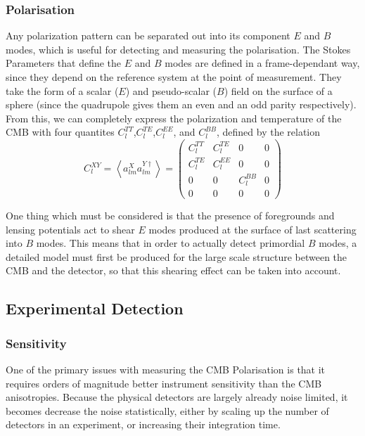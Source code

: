\subsubsection{Polarisation}
Any polarization pattern can be separated out into its component $E$ and $B$ modes, which is useful for detecting and measuring the polarisation. The Stokes Parameters that define the $E$ and $B$ modes are defined in a frame-dependant way, since they depend on the reference system at the point of measurement. They take the form of a scalar ($E$) and pseudo-scalar ($B$) field on the surface of a sphere (since the quadrupole gives them an even and an odd parity respectively). From this, we can completely express the polarization and temperature of the CMB with four quantites $C_l^{TT}$,$C_l^{TE}$,$C_l^{EE}$, and $C_l^{BB}$, defined by the relation
\begin{equation} \label{eq:cmb_plr_tmp}
	C_l^{XY} = \left< a_{lm}^X a_{lm}^{Y\dagger} \right> = \begin{pmatrix}
		C_l^{TT} & C_l^{TE} & 0        & 0 \\
		C_l^{TE} & C_l^{EE} & 0        & 0 \\
		0        & 0        & C_l^{BB} & 0 \\
		0        & 0        & 0        & 0 
	\end{pmatrix}
\end{equation}

\par One thing which must be considered is that the presence of foregrounds and lensing potentials act to shear $E$ modes produced at the surface of last scattering into $B$ modes. This means that in order to actually detect primordial $B$ modes, a detailed model must first be produced for the large scale structure between the CMB and the detector, so that this shearing effect can be taken into account.

\subsection{Experimental Detection}

\subsubsection{Sensitivity}
One of the primary issues with measuring the CMB Polarisation is that it requires orders of magnitude better instrument sensitivity than the CMB anisotropies. Because the physical detectors are largely already noise limited, it becomes decrease the noise statistically, either by scaling up the number of detectors in an experiment, or increasing their integration time.

